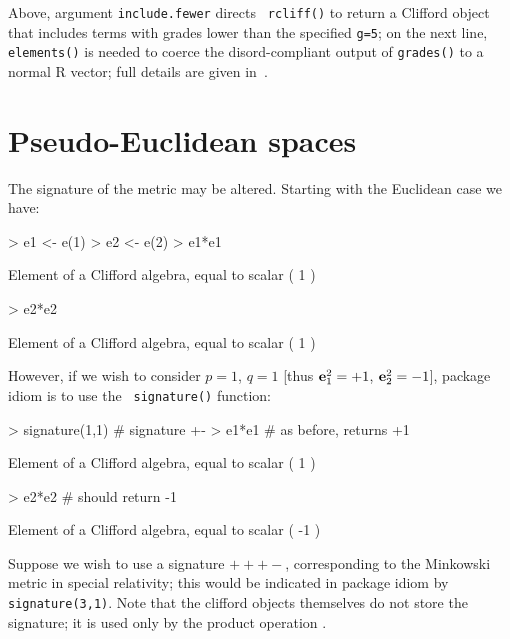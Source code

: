 \documentclass{birkjour}
\theoremstyle{definition}
\theoremstyle{remark}
\numberwithin{equation}{section}
\begin{document}
Above, argument {\tt include.fewer} directs {\tt
    rcliff()} to return a Clifford object that includes terms with
  grades lower than the specified {\tt g=5}; on the next line, {\tt
    elements()} is needed to coerce the disord-compliant output of
  {\tt grades()} to a normal R vector; full details are given
  in~\cite{hankin2022_disordR}.

\section{Pseudo-Euclidean spaces}

The signature of the metric may be altered.  Starting with the
Euclidean case we have:
    
\begin{Schunk}
\begin{Sinput}
> e1 <- e(1)
> e2 <- e(2)
> e1*e1
\end{Sinput}
\begin{Soutput}
Element of a Clifford algebra, equal to
scalar ( 1 )
\end{Soutput}
\begin{Sinput}
> e2*e2
\end{Sinput}
\begin{Soutput}
Element of a Clifford algebra, equal to
scalar ( 1 )
\end{Soutput}
\end{Schunk}

However, if we wish to consider $p=1$, $q=1$ [thus
    ${\bf e}_{1}^2=+1$, ${\bf e}_{2}^2=-1$], package idiom is to use the {\tt
    signature()} function:

\begin{Schunk}
\begin{Sinput}
> signature(1,1)  # signature +-
> e1*e1 # as before, returns +1
\end{Sinput}
\begin{Soutput}
Element of a Clifford algebra, equal to
scalar ( 1 )
\end{Soutput}
\begin{Sinput}
> e2*e2 # should return -1
\end{Sinput}
\begin{Soutput}
Element of a Clifford algebra, equal to
scalar ( -1 )
\end{Soutput}
\end{Schunk}

Suppose we wish to use a signature $+++-$, corresponding to the
Minkowski metric in special relativity; this would be indicated in
package idiom by {\tt signature(3,1)}.  Note that the clifford objects
themselves do not store the signature; it is used only by the product
operation {\tt *}.
\end{document}

